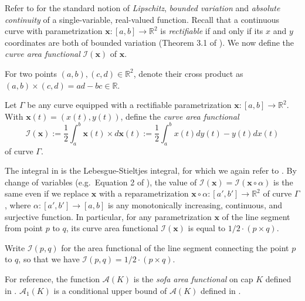 Refer to \autocite{steinRealAnalysisMeasure2005} for the standard notion of \emph{Lipschitz}, \emph{bounded variation} and \emph{absolute continuity} of a single-variable, real-valued function. Recall that a continuous curve with parametrization \(\mathbf{x} : [a, b] \to \mathbb{R}^2\) is \emph{rectifiable} if and only if its \(x\) and \(y\) coordinates are both of bounded variation (Theorem 3.1 of \autocite{steinRealAnalysisMeasure2005}). We now define the \emph{curve area functional} \(\mathcal{I}(\mathbf{x})\) of \(\mathbf{x}\).

\begin{definition}

For two points \((a, b), (c, d) \in \mathbb{R}^2\), denote their cross product as \((a, b) \times (c, d) = ad - bc \in \mathbb{R}\).

\label{def:planar-cross-product}
\end{definition}

\begin{definition}

Let \(\Gamma\) be any curve equipped with a rectifiable parametrization \(\mathbf{x} : [a, b] \to \mathbb{R}^2\). With \(\mathbf{x}(t) = (x(t), y(t))\), define the \emph{curve area functional}
\[
\mathcal{I}(\mathbf{x}) := \frac{1}{2} \int_a^b \mathbf{x}(t) \times d\mathbf{x}(t) := \frac{1}{2} \int_a^b x(t) dy(t) - y(t) dx(t)
\]
of curve \(\Gamma\).

\label{def:curve-area-functional}
\end{definition}

The integral in  is the Lebesgue-Stieltjes integral, for which we again refer to \autocite{steinRealAnalysisMeasure2005}. By change of variables (e.g.~Equation 2 of \autocite{falknerSubstitutionRuleLebesgue2012}), the value of \(\mathcal{I}(\mathbf{x}) = \mathcal{I}(\mathbf{x} \circ \alpha)\) is the same even if we replace \(\mathbf{x}\) with a reparametrization \(\mathbf{x} \circ \alpha : [a', b'] \to \mathbb{R}^2\) of curve \(\Gamma\), where \(\alpha : [a', b'] \to [a, b]\) is any monotonically increasing, continuous, and surjective function. In particular, for any parametrization \(\mathbf{x}\) of the line segment from point \(p\) to \(q\), its curve area functional \(\mathcal{I}(\mathbf{x})\) is equal to \(1/2 \cdot (p \times q)\).

\begin{definition}

Write \(\mathcal{I}(p, q)\) for the area functional of the line segment connecting the point \(p\) to \(q\), so that we have \(\mathcal{I}(p, q) = 1/2 \cdot (p \times q)\).

\label{def:curve-area-functional-segment}
\end{definition}

For reference, the function \(\mathcal{A}(K)\) is the \emph{sofa area functional} on cap \(K\) defined in . \(\mathcal{A}_1(K)\) is a conditional upper bound of \(\mathcal{A}(K)\) defined in .